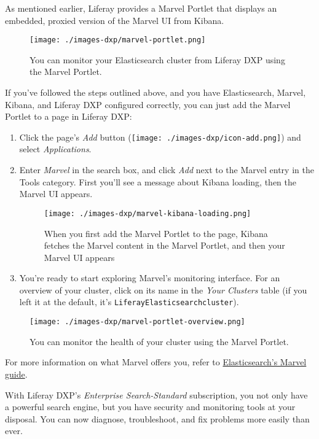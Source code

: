 As mentioned earlier, Liferay provides a Marvel Portlet that displays an
embedded, proxied version of the Marvel UI from Kibana.

\begin{figure}
\centering
\texttt{[image: ./images-dxp/marvel-portlet.png]}
\caption{You can monitor your Elasticsearch cluster from Liferay DXP
using the Marvel Portlet.}
\end{figure}

If you've followed the steps outlined above, and you have Elasticsearch,
Marvel, Kibana, and Liferay DXP configured correctly, you can just add
the Marvel Portlet to a page in Liferay DXP:

\begin{enumerate}
\def\labelenumi{\arabic{enumi}.}
\item
  Click the page's \emph{Add} button
  (\texttt{[image: ./images-dxp/icon-add.png]}) and select
  \emph{Applications}.
\item
  Enter \emph{Marvel} in the search box, and click \emph{Add} next to
  the Marvel entry in the Tools category. First you'll see a message
  about Kibana loading, then the Marvel UI appears.

  \begin{figure}
  \centering
  \texttt{[image: ./images-dxp/marvel-kibana-loading.png]}
  \caption{When you first add the Marvel Portlet to the page, Kibana
  fetches the Marvel content in the Marvel Portlet, and then your Marvel
  UI appears}
  \end{figure}
\item
  You're ready to start exploring Marvel's monitoring interface. For an
  overview of your cluster, click on its name in the \emph{Your
  Clusters} table (if you left it at the default, it's
  \texttt{LiferayElasticsearchcluster}).
\end{enumerate}

\begin{figure}
\centering
\texttt{[image: ./images-dxp/marvel-portlet-overview.png]}
\caption{You can monitor the health of your cluster using the Marvel
Portlet.}
\end{figure}

For more information on what Marvel offers you, refer to
\href{https://www.elastic.co/guide/en/marvel/2.4/index.html}{Elasticsearch's
Marvel guide}.

With Liferay DXP's \emph{Enterprise Search-Standard} subscription, you
not only have a powerful search engine, but you have security and
monitoring tools at your disposal. You can now diagnose, troubleshoot,
and fix problems more easily than ever.

